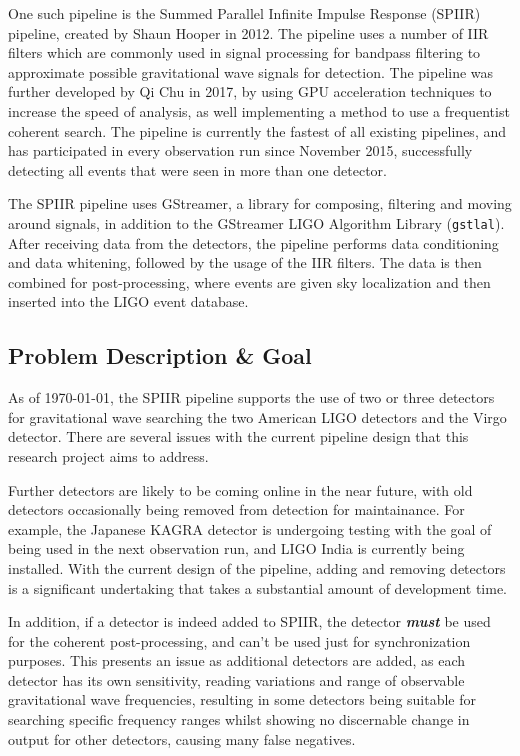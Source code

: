 \documentclass{article}
\begin{document}
One such pipeline is the Summed Parallel Infinite Impulse Response (SPIIR) pipeline, created by
Shaun Hooper in 2012. The pipeline uses a number of IIR filters \textendash{} which are commonly
used in signal processing for bandpass filtering \textendash{} to approximate possible gravitational
wave signals for detection. The pipeline was further developed by Qi Chu in 2017, by using GPU
acceleration techniques to increase the speed of analysis, as well implementing a method to use a
frequentist coherent search. The pipeline is currently the fastest of all existing pipelines, and
has participated in every observation run since November 2015, successfully detecting all events
that were seen in more than one detector.

The SPIIR pipeline uses GStreamer, a library for composing, filtering and moving around signals, in
addition to the GStreamer LIGO Algorithm Library (\texttt{gstlal}). After receiving data from the
detectors, the pipeline performs data conditioning and data whitening, followed by the usage of the
IIR filters. The data is then combined for post-processing, where events are given sky localization
and then inserted into the LIGO event database.

\subsection{Problem Description \& Goal}
As of \today{}, the SPIIR pipeline supports the use of two or three detectors for gravitational
wave searching \textendash{} the two American LIGO detectors and the Virgo detector. There are
several issues with the current pipeline design that this research project aims to address.

Further detectors are likely to be coming online in the near future, with old detectors occasionally
being removed from detection for maintainance. For example, the Japanese KAGRA detector is
undergoing testing with the goal of being used in the next observation run, and LIGO India is
currently being installed. With the current design of the pipeline, adding and removing detectors is
a significant undertaking that takes a substantial amount of development time.

In addition, if a detector is indeed added to SPIIR, the detector \textit{\textbf{must}} be used for
the coherent post-processing, and can't be used just for synchronization purposes. This presents an
issue as additional detectors are added, as each detector has its own sensitivity, reading
variations and range of observable gravitational wave frequencies, resulting in some detectors being
suitable for searching specific frequency ranges whilst showing no discernable change in output for
other detectors, causing many false negatives.
\end{document}
